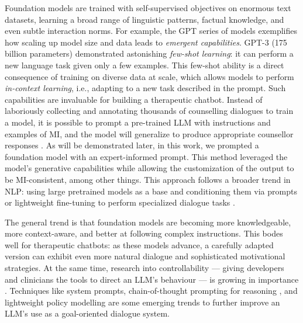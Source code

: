Foundation models are trained with self-supervised objectives on enormous text datasets, learning a broad range of linguistic patterns, factual knowledge, and even subtle interaction norms. For example, the GPT series of models exemplifies how scaling up model size and data leads to \emph{emergent capabilities}. GPT-3 \cite{brown2020language} (175 billion parameters) demonstrated astonishing \emph{few-shot learning}: it can perform a new language task given only a few examples. This few-shot ability is a direct consequence of training on diverse data at scale, which allows models to perform \emph{in-context learning}, i.e., adapting to a new task described in the prompt. Such capabilities are invaluable for building a therapeutic chatbot. Instead of laboriously collecting and annotating thousands of counselling dialogues to train a model, it is possible to prompt a pre-trained LLM with instructions and examples of MI, and the model will generalize to produce appropriate counsellor responses \cite{xie-etal-2024-shot-dialogue}. As will be demonstrated later, in this work, we prompted a foundation model with an expert-informed prompt. This method leveraged the model's generative capabilities while allowing the customization of the output to be MI-consistent, among other things. This approach follows a broader trend in NLP: using large pretrained models as a base and conditioning them via prompts or lightweight fine-tuning to perform specialized dialogue tasks \cite{10.5555/3600270.3602070}.


The general trend is that foundation models are becoming more knowledgeable, more context-aware, and better at following complex instructions. This bodes well for therapeutic chatbots: as these models advance, a carefully adapted version can exhibit even more natural dialogue and sophisticated motivational strategies. At the same time, research into controllability --- giving developers and clinicians the tools to direct an LLM's behaviour --- is growing in importance \cite{fernandez-etal-2025-lamia}. Techniques like system prompts, chain-of-thought prompting for reasoning \cite{10.5555/3600270.3602070}, and lightweight policy modelling \cite{du-etal-2024-rewarding} are some emerging trends to further improve an LLM's use as a goal-oriented dialogue system.


